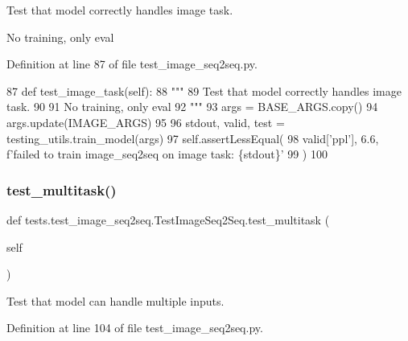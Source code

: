 \begin{DoxyVerb}Test that model correctly handles image task.

No training, only eval
\end{DoxyVerb}
 

Definition at line 87 of file test\+\_\+image\+\_\+seq2seq.\+py.


\begin{DoxyCode}
87     \textcolor{keyword}{def }test\_image\_task(self):
88         \textcolor{stringliteral}{"""}
89 \textcolor{stringliteral}{        Test that model correctly handles image task.}
90 \textcolor{stringliteral}{}
91 \textcolor{stringliteral}{        No training, only eval}
92 \textcolor{stringliteral}{        """}
93         args = BASE\_ARGS.copy()
94         args.update(IMAGE\_ARGS)
95 
96         stdout, valid, test = testing\_utils.train\_model(args)
97         self.assertLessEqual(
98             valid[\textcolor{stringliteral}{'ppl'}], 6.6, f\textcolor{stringliteral}{'failed to train image\_seq2seq on image task: \{stdout\}'}
99         )
100 
\end{DoxyCode}
\mbox{\label{classtests_1_1test__image__seq2seq_1_1TestImageSeq2Seq_aa38e563849001e35ebc02d83bc3f12d6}} 
\subsubsection{\texorpdfstring{test\+\_\+multitask()}{test\_multitask()}}
{\footnotesize\ttfamily def tests.\+test\+\_\+image\+\_\+seq2seq.\+Test\+Image\+Seq2\+Seq.\+test\+\_\+multitask (\begin{DoxyParamCaption}\item[{}]{self }\end{DoxyParamCaption})}

\begin{DoxyVerb}Test that model can handle multiple inputs.
\end{DoxyVerb}
 

Definition at line 104 of file test\+\_\+image\+\_\+seq2seq.\+py.


